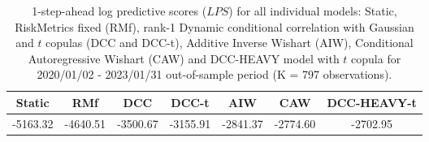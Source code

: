 \begin{table}[ht]
\centering
\caption{1-step-ahead log predictive scores ($LPS$) 
             for all individual models: Static, RiskMetrics fixed (RMf),
rank-1 Dynamic conditional correlation with Gaussian and $t$ copulas (DCC
and DCC-t), Additive Inverse Wishart (AIW), Conditional Autoregressive Wishart (CAW)
and DCC-HEAVY model with $t$ copula for 
2020/01/02 - 2023/01/31 out-of-sample period
(K = 797 observations).} 
\label{table:lps_FX}
\begin{tabular}{ccccccc}
  \hline
Static & RMf & DCC & DCC-t & AIW & CAW & DCC-HEAVY-t \\ 
  \hline
-5163.32 & -4640.51 & -3500.67 & -3155.91 & -2841.37 & -2774.60 & -2702.95 \\ 
   \hline
\end{tabular}
\end{table}
